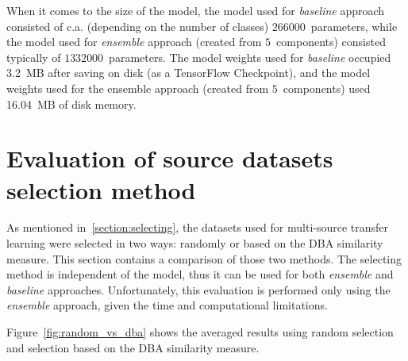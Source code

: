 \documentclass[a4paper,11pt,twoside]{report}
\theoremstyle{definition}
\begin{document}
When it comes to the size of the model, the model used for \textit{baseline} approach consisted of c.a. (depending on the number of classes) $266 000$~parameters, while the model used for \textit{ensemble} approach (created from $5$~components) consisted typically of $1 332 000$~parameters. The model weights used for \textit{baseline} occupied 3.2~MB after saving on disk (as a TensorFlow Checkpoint), and the model weights used for the ensemble approach (created from $5$~components) used 16.04~MB of disk memory.

\section{Evaluation of source datasets selection method}
As mentioned in~\ref{section:selecting}, the datasets used for multi-source transfer learning were selected in two ways: randomly or based on the DBA similarity measure. This section contains a comparison of those two methods. The selecting method is independent of the model, thus it can be used for both \textit{ensemble} and \textit{baseline} approaches. Unfortunately, this evaluation is performed only using the \textit{ensemble} approach, given the time and computational limitations.

Figure~\ref{fig:random_vs_dba} shows the averaged results using random selection and selection based on the DBA similarity measure.
\end{document}
